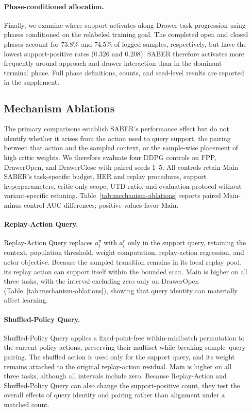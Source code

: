\documentclass[letterpaper]{article}
\begin{document}
\paragraph{Phase-conditioned allocation.}
Finally, we examine where support activates along Drawer task progression using phases conditioned on the relabeled training goal. The completed open and closed phases account for \(73.8\%\) and \(74.5\%\) of logged samples, respectively, but have the lowest support-positive rates (\(0.326\) and \(0.208\)). SABER therefore activates more frequently around approach and drawer interaction than in the dominant terminal phase. Full phase definitions, counts, and seed-level results are reported in the supplement.

\subsection{Mechanism Ablations}

The primary comparisons establish SABER's performance effect but do not identify whether it arises from the action used to query support, the pairing between that action and the sampled context, or the sample-wise placement of high critic weights. We therefore evaluate four DDPG controls on FPP, DrawerOpen, and DrawerClose with paired seeds 1--5. All controls retain Main SABER's task-specific budget, HER and replay procedures, support hyperparameters, critic-only scope, UTD ratio, and evaluation protocol without variant-specific retuning. Table~\ref{tab:mechanism-ablations} reports paired Main-minus-control AUC differences; positive values favor Main.

\paragraph{Replay-Action Query.}
Replay-Action Query replaces \(a_i^\pi\) with \(a_i^r\) only in the support query, retaining the context, population threshold, weight computation, replay-action regression, and actor objective. Because the sampled transition remains in its local replay pool, its replay action can support itself within the bounded scan. Main is higher on all three tasks, with the interval excluding zero only on DrawerOpen (Table~\ref{tab:mechanism-ablations}), showing that query identity can materially affect learning.

\paragraph{Shuffled-Policy Query.}
Shuffled-Policy Query applies a fixed-point-free within-minibatch permutation to the current-policy actions, preserving their multiset while breaking sample--query pairing. The shuffled action is used only for the support query, and its weight remains attached to the original replay-action residual. Main is higher on all three tasks, although all intervals include zero. Because Replay-Action and Shuffled-Policy Query can also change the support-positive count, they test the overall effects of query identity and pairing rather than alignment under a matched count.
\end{document}
